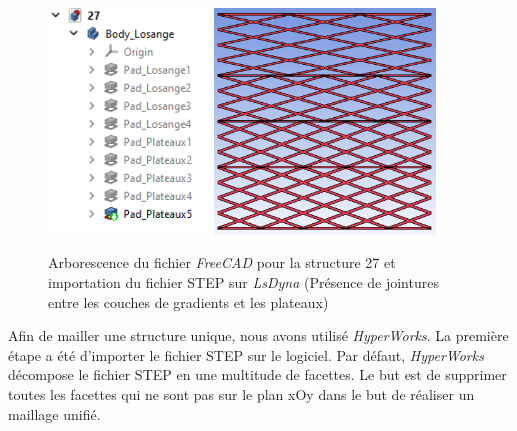 \documentclass[a4paper]{article}
\begin{document}
	\begin{figure}[H]
		\centering
		\includegraphics[height=6cm]{Images/8/8_1/arborescence_freecad.png}
		\includegraphics[height=6cm]{Images/8/8_1/step_lsdyna.png}\\
		\caption{Arborescence du fichier \textit{FreeCAD} pour la structure 27 et importation du fichier STEP sur \textit{LsDyna} (Présence de jointures entre les couches de gradients et les plateaux)}
	\end{figure}
	
	\hspace{0.5cm}Afin de mailler une structure unique, nous avons utilisé \textit{HyperWorks}. La première étape a été d’importer le fichier STEP sur le logiciel. Par défaut, \textit{HyperWorks} décompose le fichier STEP en une multitude de facettes. Le but est de supprimer toutes les facettes qui ne sont pas sur le plan xOy dans le but de réaliser un maillage unifié.
	
\end{document}
